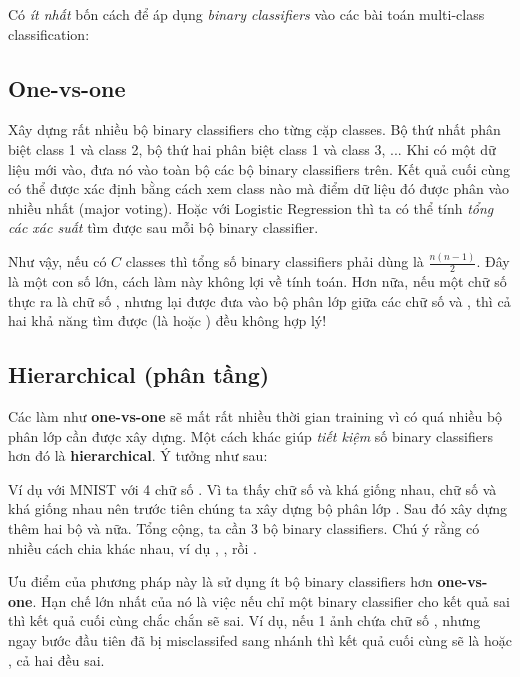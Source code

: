 Có \textit{ít nhất} bốn cách để áp dụng \textit{binary classifiers} vào các bài toán multi-class classification: 
 
 
\subsection{One-vs-one}
 
Xây dựng rất nhiều bộ binary classifiers cho từng cặp classes. Bộ thứ nhất phân biệt class 1 và class 2, bộ thứ hai phân biệt class 1 và class 3, ... Khi có một dữ liệu mới vào, đưa nó vào toàn bộ các bộ binary classifiers trên. Kết quả cuối cùng có thể được xác định bằng cách xem class nào mà điểm dữ liệu đó được phân vào nhiều nhất (major voting). Hoặc với Logistic Regression thì ta có thể tính \textit{tổng các xác suất} tìm được sau mỗi bộ binary classifier.  
  
Như vậy, nếu có $C$ classes thì tổng số binary classifiers phải dùng là $\frac{n(n-1)}{2}$. Đây là một con số lớn, cách làm này không lợi về tính toán. Hơn nữa, nếu một chữ số thực ra là chữ số , nhưng lại được đưa vào bộ phân lớp giữa các chữ số  và , thì cả hai khả năng tìm được (là  hoặc ) đều không hợp lý! 
 
 
\subsection{Hierarchical (phân tầng)}
Các làm như \textbf{one-vs-one} sẽ mất rất nhiều thời gian training vì có quá nhiều bộ phân lớp cần được xây dựng. Một cách khác giúp \textit{tiết kiệm} số binary classifiers hơn đó là \textbf{hierarchical}. Ý tưởng như sau: 
 
Ví dụ với MNIST với 4 chữ số . Vì ta thấy chữ số  và  khá giống nhau, chữ số  và  khá giống nhau nên trước tiên chúng ta xây dựng bộ phân lớp . Sau đó xây dựng thêm hai bộ  và  nữa. Tổng cộng, ta cần 3 bộ binary classifiers. Chú ý rằng có nhiều cách chia khác nhau, ví dụ , , rồi .  
 
 
Ưu điểm của phương pháp này là sử dụng ít bộ binary classifiers hơn \textbf{one-vs-one}.  
Hạn chế lớn nhất của nó là việc nếu chỉ một binary classifier cho kết quả sai thì kết quả cuối cùng chắc chắn sẽ sai. Ví dụ, nếu 1 ảnh chứa chữ số , nhưng ngay bước đầu tiên đã bị misclassifed sang nhánh \pythoninline{[4, 7]} thì kết quả cuối cùng sẽ là  hoặc , cả hai đều sai.  
 
